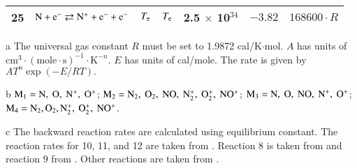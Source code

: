 \documentclass{warpdoc}
\begin{document}
\begin{table}[t]
\begin{center}
\begin{threeparttable}
\begin{tabular}{ccccccc}
25 & $\rm N + e^- \rightleftarrows N^+ + e^- + e^- $ & $T_{\rm e}$ & $T_{\rm e}$ & 2.5 $\times$ 10$^{34}$  & $-3.82$ & $168600 \cdot R$ \\


\bottomrule
\end{tabular}
\begin{tablenotes}
\item[{a}] The universal gas constant $R$ must be set to 1.9872	cal/K$\cdot$mol. $A$ has units of $\textrm{cm}^3\cdot(\textrm{mole}\cdot \textrm{s})^{-1}\cdot \textrm{K}^{-n}$. $E$ has units of cal/mole. The rate is given by $A T^n \exp(-E/RT).$
\item[{b}] $\rm M_1=N,~O,~N^+,~O^+$; $\rm M_2=N_2,~O_2,~NO,~N_2^+,~O_2^+,~NO^+$; $\rm M_3= N,~O,~NO,~N^+,~O^+$; $\rm M_4=N_2,O_2,N_2^+,~O_2^+,~NO^+$.
\item[{c}] The backward reaction rates are calculated using equilibrium constant. The reaction rates for 10, 11, and 12 are taken from \cite{pf:2007:boyd}. Reaction 8 is taken from \cite{jcp:1997:bose} and reaction 9 from \cite{jcp:1996:bose}. Other reactions are taken from \cite{book:1990:park}.
\end{tablenotes}
\label{tab:parent2023}
\end{threeparttable}
\end{center}
\end{table}
%
\end{document}
